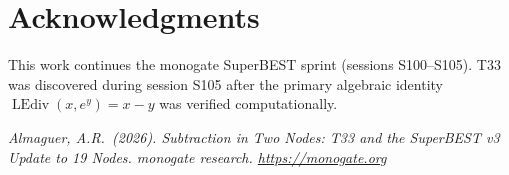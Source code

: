 \documentclass[12pt,a4paper]{article}
\theoremstyle{definition}
\newcommand{\LEdiv}{\operatorname{LEdiv}}
\begin{document}
\section*{Acknowledgments}

This work continues the monogate SuperBEST sprint (sessions S100--S105).
T33 was discovered during session S105 after the primary algebraic identity
$\LEdiv(x, e^y) = x - y$ was verified computationally.

\bigskip
\noindent\textit{Almaguer, A.R.\ (2026).
Subtraction in Two Nodes: T33 and the SuperBEST v3 Update to 19 Nodes.
monogate research. \url{https://monogate.org}}
\end{document}
